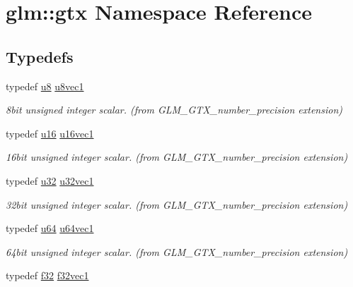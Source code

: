 \hypertarget{namespaceglm_1_1gtx}{}\section{glm\+:\+:gtx Namespace Reference}
\label{namespaceglm_1_1gtx}
\subsection*{Typedefs}
\begin{DoxyCompactItemize}
\item 
typedef \hyperlink{group__gtc__type__precision_ga5e3dc67373d5068997d2d9f41c9024d2}{u8} \hyperlink{group__gtx__number__precision_ga35ae7849593a354420e4f52d1b36c2d6}{u8vec1}
\begin{DoxyCompactList}\small\item\em 8bit unsigned integer scalar. (from G\+L\+M\+\_\+\+G\+T\+X\+\_\+number\+\_\+precision extension) \end{DoxyCompactList}\item 
typedef \hyperlink{group__gtc__type__precision_gae7a1571503f83d2264ddfa705a6b082a}{u16} \hyperlink{group__gtx__number__precision_ga807d7e5f24e981b1575bd40ca159781d}{u16vec1}
\begin{DoxyCompactList}\small\item\em 16bit unsigned integer scalar. (from G\+L\+M\+\_\+\+G\+T\+X\+\_\+number\+\_\+precision extension) \end{DoxyCompactList}\item 
typedef \hyperlink{group__gtc__type__precision_ga54e837745059fd29017bed71cfa0a8db}{u32} \hyperlink{group__gtx__number__precision_gac46a7890b20928df83e734c3ea9557d4}{u32vec1}
\begin{DoxyCompactList}\small\item\em 32bit unsigned integer scalar. (from G\+L\+M\+\_\+\+G\+T\+X\+\_\+number\+\_\+precision extension) \end{DoxyCompactList}\item 
typedef \hyperlink{group__gtc__type__precision_ga71cedd4972f9cb1a5e14dfe5ab83ecd7}{u64} \hyperlink{group__gtx__number__precision_ga92812a1d7e746bcaba61d2f5a64afc52}{u64vec1}
\begin{DoxyCompactList}\small\item\em 64bit unsigned integer scalar. (from G\+L\+M\+\_\+\+G\+T\+X\+\_\+number\+\_\+precision extension) \end{DoxyCompactList}\item 
typedef \hyperlink{group__gtc__type__precision_ga0ec999b57f5330d9021256e96038df04}{f32} \hyperlink{group__gtx__number__precision_gadab8e598b0b4697629482682bdb7f223}{f32vec1}

\end{DoxyCompactItemize}
